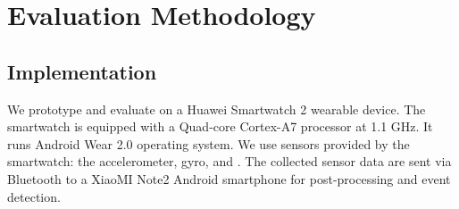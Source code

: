 \section{Evaluation Methodology}
\subsection{Implementation}
We prototype and evaluate \systemname on a Huawei Smartwatch 2 wearable device. The smartwatch is equipped with a Quad-core Cortex-A7
processor at 1.1 GHz.  It runs Android Wear 2.0 operating system. We use  sensors provided by the smartwatch: the
accelerometer, gyro, and . The collected sensor data are sent via Bluetooth to a XiaoMI Note2 Android smartphone for
post-processing and event detection.




